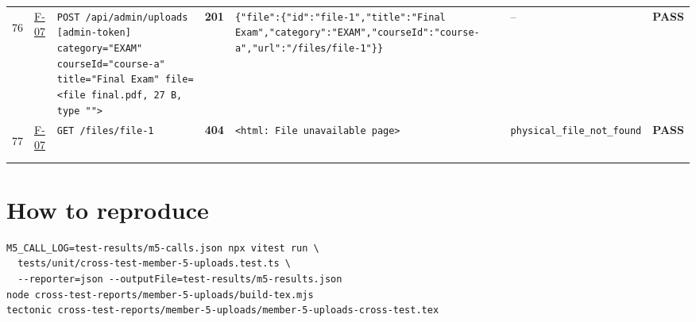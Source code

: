 \documentclass[10pt,a4paper]{article}
\begin{document}
\begin{landscape}
\begin{longtable}{@{}P{0.6cm}P{0.9cm}P{8.5cm}P{1.0cm}P{6.2cm}P{4.2cm}P{1.1cm}@{}}
\hypertarget{call76}{76} & \hyperlink{test-F-07}{F-07} & \texttt{POST /\allowbreak{}api/\allowbreak{}admin/\allowbreak{}uploads [admin-\allowbreak{}token] category=\allowbreak{}"\allowbreak{}EXAM"\allowbreak{} courseId=\allowbreak{}"\allowbreak{}course-\allowbreak{}a"\allowbreak{} title=\allowbreak{}"\allowbreak{}Final Exam"\allowbreak{} file=\allowbreak{}<file final.\allowbreak{}pdf,\allowbreak{} 27 B,\allowbreak{} type "\allowbreak{}"\allowbreak{}>} & \textcolor{passgreen}{\textbf{201}} & \texttt{\{"\allowbreak{}file"\allowbreak{}:\allowbreak{}\{"\allowbreak{}id"\allowbreak{}:\allowbreak{}"\allowbreak{}file-\allowbreak{}1"\allowbreak{},\allowbreak{}"\allowbreak{}title"\allowbreak{}:\allowbreak{}"\allowbreak{}Final Exam"\allowbreak{},\allowbreak{}"\allowbreak{}category"\allowbreak{}:\allowbreak{}"\allowbreak{}EXAM"\allowbreak{},\allowbreak{}"\allowbreak{}courseId"\allowbreak{}:\allowbreak{}"\allowbreak{}course-\allowbreak{}a"\allowbreak{},\allowbreak{}"\allowbreak{}url"\allowbreak{}:\allowbreak{}"\allowbreak{}/\allowbreak{}files/\allowbreak{}file-\allowbreak{}1"\allowbreak{}\}\}} & -- & \textcolor{passgreen}{\textbf{PASS}} \\
\hypertarget{call77}{77} & \hyperlink{test-F-07}{F-07} & \texttt{GET /\allowbreak{}files/\allowbreak{}file-\allowbreak{}1} & \textcolor{warnamber}{\textbf{404}} & \texttt{<html:\allowbreak{} File unavailable page>} & \texttt{physical\_\allowbreak{}file\_\allowbreak{}not\_\allowbreak{}found} & \textcolor{passgreen}{\textbf{PASS}} \\
\bottomrule
\end{longtable}
\normalsize
\end{landscape}

\section*{How to reproduce}
\begin{verbatim}
M5_CALL_LOG=test-results/m5-calls.json npx vitest run \
  tests/unit/cross-test-member-5-uploads.test.ts \
  --reporter=json --outputFile=test-results/m5-results.json
node cross-test-reports/member-5-uploads/build-tex.mjs
tectonic cross-test-reports/member-5-uploads/member-5-uploads-cross-test.tex
\end{verbatim}
\end{document}
